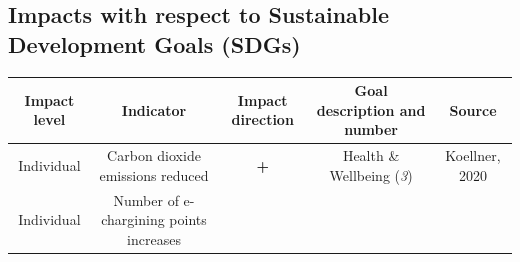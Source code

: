 \documentclass[
]{book}
\begin{document}
\hypertarget{impacts-with-respect-to-sustainable-development-goals-sdgs-14}{%
\subsection*{Impacts with respect to Sustainable Development Goals (SDGs)}\label{impacts-with-respect-to-sustainable-development-goals-sdgs-14}}

\begin{longtable}[]{@{}ccccc@{}}
\toprule
\begin{minipage}[b]{0.17\columnwidth}\centering
Impact level\strut
\end{minipage} & \begin{minipage}[b]{0.16\columnwidth}\centering
Indicator\strut
\end{minipage} & \begin{minipage}[b]{0.17\columnwidth}\centering
Impact direction\strut
\end{minipage} & \begin{minipage}[b]{0.17\columnwidth}\centering
Goal description and number\strut
\end{minipage} & \begin{minipage}[b]{0.17\columnwidth}\centering
Source\strut
\end{minipage}\tabularnewline
\midrule
\endhead
\begin{minipage}[t]{0.17\columnwidth}\centering
Individual\strut
\end{minipage} & \begin{minipage}[t]{0.16\columnwidth}\centering
Carbon dioxide emissions reduced\strut
\end{minipage} & \begin{minipage}[t]{0.17\columnwidth}\centering
\textbf{+}\strut
\end{minipage} & \begin{minipage}[t]{0.17\columnwidth}\centering
Health \& Wellbeing (\emph{3})\strut
\end{minipage} & \begin{minipage}[t]{0.17\columnwidth}\centering
Koellner, 2020\strut
\end{minipage}\tabularnewline
\begin{minipage}[t]{0.17\columnwidth}\centering
Individual\strut
\end{minipage} & \begin{minipage}[t]{0.16\columnwidth}\centering
Number of e-chargining points increases\strut

\end{minipage}
\end{longtable}
\end{document}
